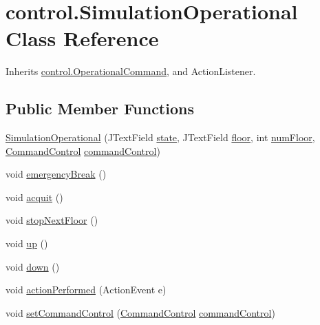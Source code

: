 \hypertarget{classcontrol_1_1_simulation_operational}{}\section{control.\+Simulation\+Operational Class Reference}
\label{classcontrol_1_1_simulation_operational}


Inherits \mbox{\hyperlink{interfacecontrol_1_1_operational_command}{control.\+Operational\+Command}}, and Action\+Listener.

\subsection*{Public Member Functions}
\begin{DoxyCompactItemize}
\item 
\mbox{\hyperlink{classcontrol_1_1_simulation_operational_a05ea4626f887de31e4c40b3ff2e52162}{Simulation\+Operational}} (J\+Text\+Field \mbox{\hyperlink{classcontrol_1_1_simulation_operational_a00a11786ca7a99c8e6ee6b3990300ac6}{state}}, J\+Text\+Field \mbox{\hyperlink{classcontrol_1_1_simulation_operational_a0b981ca8176d219f57d95af4f780699d}{floor}}, int \mbox{\hyperlink{classcontrol_1_1_simulation_operational_a8b244e8cd89afb3060e4025c76f3ccc1}{num\+Floor}}, \mbox{\hyperlink{interfacecontrol_1_1_command_control}{Command\+Control}} \mbox{\hyperlink{classcontrol_1_1_simulation_operational_a381628f543ab9b586023f718af9a279d}{command\+Control}})
\item 
void \mbox{\hyperlink{classcontrol_1_1_simulation_operational_a1d385c1f369eb3aff538c36b5947f8ed}{emergency\+Break}} ()
\item 
void \mbox{\hyperlink{classcontrol_1_1_simulation_operational_a66881a9f2cf8526dee93b756f8ad47af}{acquit}} ()
\item 
void \mbox{\hyperlink{classcontrol_1_1_simulation_operational_a2ca8414424f8becf5c5942b9dbba80aa}{stop\+Next\+Floor}} ()
\item 
void \mbox{\hyperlink{classcontrol_1_1_simulation_operational_ab3ade4511703ee9715f82ce6e9a036a0}{up}} ()
\item 
void \mbox{\hyperlink{classcontrol_1_1_simulation_operational_a67c7dc0ec1b837a8174d127cb6803eb9}{down}} ()
\item 
void \mbox{\hyperlink{classcontrol_1_1_simulation_operational_a9cce36fe391bc34c0b5bdbbef9244f05}{action\+Performed}} (Action\+Event e)
\item 
void \mbox{\hyperlink{classcontrol_1_1_simulation_operational_a66fd6c0df3888639296a867c106590e3}{set\+Command\+Control}} (\mbox{\hyperlink{interfacecontrol_1_1_command_control}{Command\+Control}} \mbox{\hyperlink{classcontrol_1_1_simulation_operational_a381628f543ab9b586023f718af9a279d}{command\+Control}})
\end{DoxyCompactItemize}

